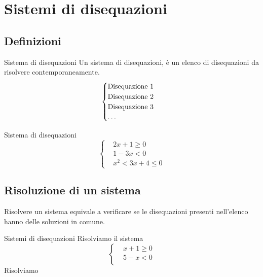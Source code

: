 \chapter{Sistemi di disequazioni}
\section{Definizioni}
\begin{definizionet}{Sistema di disequazioni}{}
	Un sistema di disequazioni, è un elenco di disequazioni da risolvere contemporaneamente.\[\begin{cases}
	\text{Disequazione 1}\\
		\text{Disequazione 2}\\
			\text{Disequazione 3}\\
				\text{\dots}\\
	\end{cases} \]
\end{definizionet}
\begin{esempiot}{Sistema di disequazioni}{}
\[\begin{cases}
&2x+1\geq 0\\
&1-3x<0\\
&x^2<3x+4\leq 0
\end{cases}\]
\end{esempiot}
\section{Risoluzione di un sistema}
Risolvere un sistema equivale a verificare se le disequazioni presenti nell'elenco hanno delle soluzioni in comune. 
\begin{esempiot}{Sistemi di disequazioni}{}
	Risolviamo il sistema 
	\[\begin{cases}
	&x+1\geq 0\\
	&5-x<0\\
	\end{cases}\]
	Risolviamo 
\end{esempiot}
